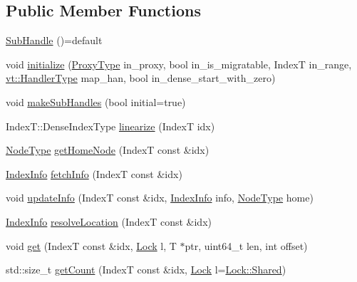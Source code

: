 \subsection*{Public Member Functions}
\begin{DoxyCompactItemize}
\item 
\hyperlink{structvt_1_1rdma_1_1_sub_handle_a451c1375245f317a93fef612e1954c96}{Sub\+Handle} ()=default
\item 
void \hyperlink{structvt_1_1rdma_1_1_sub_handle_aedc4c6df2e9a471ac5d79c390a880757}{initialize} (\hyperlink{structvt_1_1rdma_1_1_sub_handle_a758bee2e499658cfef92ace83eea6590}{Proxy\+Type} in\+\_\+proxy, bool in\+\_\+is\+\_\+migratable, IndexT in\+\_\+range, \hyperlink{namespacevt_af64846b57dfcaf104da3ef6967917573}{vt\+::\+Handler\+Type} map\+\_\+han, bool in\+\_\+dense\+\_\+start\+\_\+with\+\_\+zero)
\item 
void \hyperlink{structvt_1_1rdma_1_1_sub_handle_a24d2a25c3d1ed517b3d38fdc23067c14}{make\+Sub\+Handles} (bool initial=true)
\item 
Index\+T\+::\+Dense\+Index\+Type \hyperlink{structvt_1_1rdma_1_1_sub_handle_a35569a5d08c05d25f56136f5924e4315}{linearize} (IndexT idx)
\item 
\hyperlink{namespacevt_a866da9d0efc19c0a1ce79e9e492f47e2}{Node\+Type} \hyperlink{structvt_1_1rdma_1_1_sub_handle_ae94fc60f536d4248f76d86bf60bdc21b}{get\+Home\+Node} (IndexT const \&idx)
\item 
\hyperlink{structvt_1_1rdma_1_1_index_info}{Index\+Info} \hyperlink{structvt_1_1rdma_1_1_sub_handle_a98a57c00dcd4b2311937a1af439c10b1}{fetch\+Info} (IndexT const \&idx)
\item 
void \hyperlink{structvt_1_1rdma_1_1_sub_handle_a3bd9d6c4854f47bf9cc6eebfa9c18fca}{update\+Info} (IndexT const \&idx, \hyperlink{structvt_1_1rdma_1_1_index_info}{Index\+Info} info, \hyperlink{namespacevt_a866da9d0efc19c0a1ce79e9e492f47e2}{Node\+Type} home)
\item 
\hyperlink{structvt_1_1rdma_1_1_index_info}{Index\+Info} \hyperlink{structvt_1_1rdma_1_1_sub_handle_aee0a3506044e6f6b569e553c66e26351}{resolve\+Location} (IndexT const \&idx)
\item 
void \hyperlink{structvt_1_1rdma_1_1_sub_handle_ad470ab848b32d8d857229d7fa1ac0e22}{get} (IndexT const \&idx, \hyperlink{namespacevt_1_1rdma_ac5c20b41a653e520b6305d4d454ecb70}{Lock} l, T $\ast$ptr, uint64\+\_\+t len, int offset)
\item 
std\+::size\+\_\+t \hyperlink{structvt_1_1rdma_1_1_sub_handle_a29afd2245c28f7ad1bf7e058b62cfe07}{get\+Count} (IndexT const \&idx, \hyperlink{namespacevt_1_1rdma_ac5c20b41a653e520b6305d4d454ecb70}{Lock} l=\hyperlink{namespacevt_1_1rdma_ac5c20b41a653e520b6305d4d454ecb70aa6156ea9d66fef24e87e841fbabf7cca}{Lock\+::\+Shared})

\end{DoxyCompactItemize}
